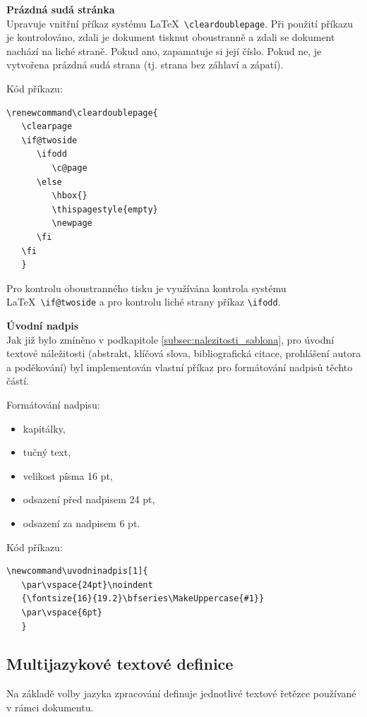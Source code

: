 \textbf{Prázdná sudá stránka}\\
Upravuje vnitřní příkaz systému \LaTeX\ \verb|\cleardoublepage|. Při použití příkazu je kontrolováno, zdali je dokument tisknut oboustranně a zdali se dokument nachází na liché straně. Pokud ano, zapamatuje si její číslo. Pokud ne, je vytvořena prázdná sudá strana (tj. strana bez záhlaví a zápatí).

Kód příkazu:

\begin{verbatim}
\renewcommand\cleardoublepage{
   \clearpage
   \if@twoside
      \ifodd
         \c@page
      \else
         \hbox{}
         \thispagestyle{empty}
         \newpage
      \fi
   \fi
   }
\end{verbatim}

Pro kontrolu oboustranného tisku je využívána kontrola systému \LaTeX\ \verb|\if@twoside| a pro kontrolu liché strany příkaz \verb|\ifodd|.

\vspace{8pt}

\textbf{Úvodní nadpis}\\
Jak již bylo zmíněno v podkapitole \ref{subsec:nalezitosti_sablona}, pro úvodní textové náležitosti (abstrakt, klíčová slova, bibliografická citace, prohlášení autora a poděkování) byl implementován vlastní příkaz pro formátování nadpisů těchto částí.

Formátování nadpisu:

\begin{itemize}[label=-]
	\item kapitálky,
	\item tučný text,
	\item velikost písma 16 pt,
	\item odsazení před nadpisem 24 pt,
	\item odsazení za nadpisem 6 pt.
\end{itemize}

Kód příkazu:

\begin{verbatim}
\newcommand\uvodninadpis[1]{
   \par\vspace{24pt}\noindent
   {\fontsize{16}{19.2}\bfseries\MakeUppercase{#1}}
   \par\vspace{6pt}
   }
\end{verbatim}

\subsection{Multijazykové textové definice}
\label{sec:texty}
Na základě volby jazyka zpracování definuje jednotlivé textové řetězce používané v rámci dokumentu.

